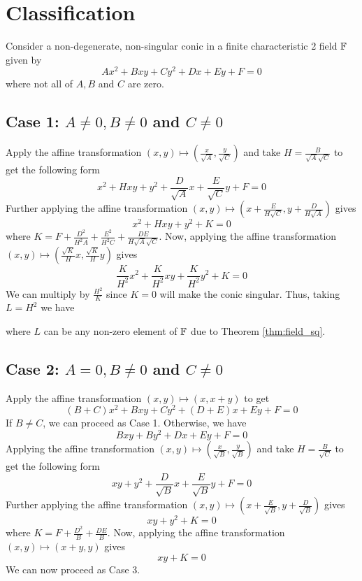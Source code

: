 \section{Classification}

Consider a non-degenerate, non-singular conic in a finite characteristic 2 field
$\mathbb{F}$ given by
\[ Ax^2 + Bxy + Cy^2 + Dx + Ey + F = 0 \]
where not all of $A,B$ and $C$ are zero.

\subsection*{Case 1: $A \neq 0, B \neq 0$ and $C \neq 0$}

Apply the affine transformation
$(x,y)\mapsto\left(\frac{x}{\sqrt{A}},\frac{y}{\sqrt{C}}\right)$ and take
$H=\frac{B}{\sqrt{A}\sqrt{C}}$ to get the following form
\[ x^2 + Hxy + y^2 + \frac{D}{\sqrt{A}}x + \frac{E}{\sqrt{C}}y + F = 0 \]
Further applying the affine transformation 
$(x,y)\mapsto\left(x+\frac{E}{H\sqrt{C}},y+\frac{D}{H\sqrt{A}}\right)$ gives
\[ x^2 + Hxy + y^2 + K = 0 \]
where
$K = F + \frac{D^2}{H^2 A} + \frac{E^2}{H^2 C} + \frac{DE}{H\sqrt{A}\sqrt{C}}$.
Now, applying the affine transformation
$(x,y)\mapsto\left(\frac{\sqrt{K}}{H}x,\frac{\sqrt{K}}{H}y\right)$ gives
\[ \frac{K}{H^2}x^2 + \frac{K}{H^2}xy + \frac{K}{H^2}y^2 + K = 0\]
We can multiply by $\frac{H^2}{K}$ since $K=0$ will make the conic singular. Thus,
taking $L=H^2$ we have

\begin{center}
\end{center}

\noindent
where $L$ can be any non-zero element of $\mathbb{F}$ due to Theorem \ref{thm:field_sq}.

\subsection*{Case 2: $A = 0, B \neq 0$ and $C \neq 0$}

Apply the affine transformation $(x,y)\mapsto(x,x+y)$ to get
\[ (B+C)x^2 + Bxy + Cy^2 + (D+E)x + Ey + F = 0 \]
If $B \neq C$, we can proceed as Case 1. Otherwise, we have
\[ Bxy + By^2 + Dx + Ey + F = 0\]
Applying the affine transformation
$(x,y)\mapsto\left(\frac{x}{\sqrt{B}},\frac{y}{\sqrt{B}}\right)$ and take
$H=\frac{B}{\sqrt{C}}$ to get the following form
\[ xy + y^2 + \frac{D}{\sqrt{B}}x + \frac{E}{\sqrt{B}}y + F = 0 \]
Further applying the affine transformation 
$(x,y)\mapsto\left(x+\frac{E}{\sqrt{B}},y+\frac{D}{\sqrt{B}}\right)$ gives
\[ xy + y^2 + K = 0 \]
where $K = F + \frac{D^2}{B} + \frac{DE}{B}$. Now, applying the affine
transformation $(x,y)\mapsto(x+y,y)$ gives
\[ xy + K = 0 \]
We can now proceed as Case 3.

